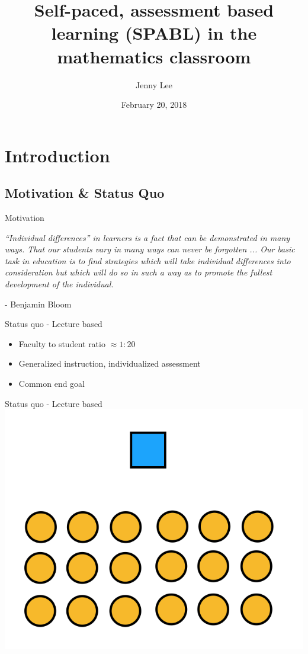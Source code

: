 \documentclass{beamer}
\title{Self-paced, assessment based learning (SPABL) in the mathematics classroom}
\date{February 20, 2018}
\author{Jenny Lee}
\institute{Harvey Mudd College\\Advisor: Dagan Karp}
\begin{document}
\maketitle
\section{Introduction}
\subsection{Motivation \& Status Quo}
\begin{frame}{Motivation}
  \begin{center}
    \textit{``Individual differences'' in learners is a fact that can be demonstrated in many ways. That our students { {\color{blue}}{vary in many ways}} can never be forgotten ... Our basic task in education is to find strategies which will take individual differences into consideration but which will do so in such a way as to { {\color{blue}} promote the fullest development of the individual}.}
  \end{center}
  \hfill- Benjamin Bloom
\end{frame}
\begin{frame}{Status quo - Lecture based}\pause
  \begin{itemize}
    \item Faculty to student ratio $\approx 1:20$ \pause
    \item Generalized instruction, individualized assessment\pause
    \item Common end goal
  \end{itemize}
\end{frame}
\begin{frame}{Status quo - Lecture based}
  \centering
    \includegraphics[scale=0.5]{lecturestyle1}
\end{frame}
\end{document}
